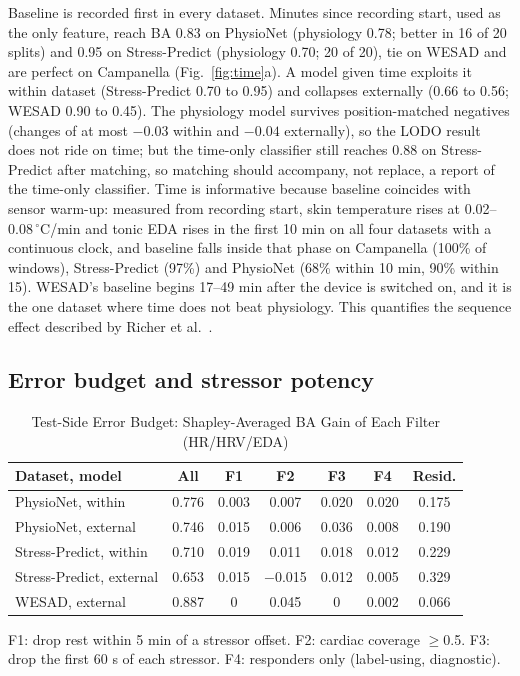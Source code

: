 \documentclass[journal]{IEEEtran}
\newcommand{\m}{$-$}
\begin{document}
Baseline is recorded first in every dataset. Minutes since recording start, used as the only feature, reach BA 0.83 on PhysioNet (physiology 0.78; better in 16 of 20 splits) and 0.95 on Stress-Predict (physiology 0.70; 20 of 20), tie on WESAD and are perfect on Campanella (Fig.~\ref{fig:time}a). A model given time exploits it within dataset (Stress-Predict 0.70 to 0.95) and collapses externally (0.66 to 0.56; WESAD 0.90 to 0.45). The physiology model survives position-matched negatives (changes of at most $-0.03$ within and $-0.04$ externally), so the LODO result does not ride on time; but the time-only classifier still reaches 0.88 on Stress-Predict after matching, so matching should accompany, not replace, a report of the time-only classifier. Time is informative because baseline coincides with sensor warm-up: measured from recording start, skin temperature rises at 0.02--0.08\,$^\circ$C/min and tonic EDA rises in the first 10 min on all four datasets with a continuous clock, and baseline falls inside that phase on Campanella (100\% of windows), Stress-Predict (97\%) and PhysioNet (68\% within 10 min, 90\% within 15). WESAD's baseline begins 17--49 min after the device is switched on, and it is the one dataset where time does not beat physiology. This quantifies the sequence effect described by Richer et al.~\cite{richer2024}.

\subsection{Error budget and stressor potency}
\begin{table}[!t]
\centering
\caption{Test-Side Error Budget: Shapley-Averaged BA Gain of Each Filter (HR/HRV/EDA)}
\label{tab:budget}
\scriptsize
\begin{tabularx}{\columnwidth}{@{}Lcccccc@{}}
\toprule
Dataset, model & All & F1 & F2 & F3 & F4 & Resid. \\
\midrule
PhysioNet, within & 0.776 & 0.003 & 0.007 & 0.020 & 0.020 & 0.175 \\
PhysioNet, external & 0.746 & 0.015 & 0.006 & 0.036 & 0.008 & 0.190 \\
Stress-Predict, within & 0.710 & 0.019 & 0.011 & 0.018 & 0.012 & 0.229 \\
Stress-Predict, external & 0.653 & 0.015 & \m0.015 & 0.012 & 0.005 & 0.329 \\
WESAD, external & 0.887 & 0 & 0.045 & 0 & 0.002 & 0.066 \\
\bottomrule
\end{tabularx}
\par\vspace{2pt}\raggedright\scriptsize F1: drop rest within 5 min of a stressor offset. F2: cardiac coverage $\ge$0.5. F3: drop the first 60 s of each stressor. F4: responders only (label-using, diagnostic).
\end{table}
\end{document}
